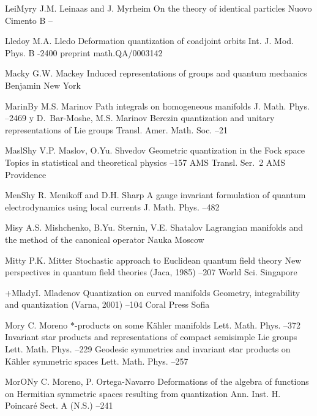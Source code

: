 \documentclass[11pt]{amsart}
\numberwithin{equation}{section}
\theoremstyle{remark}
\newcommand{\by}{\mathbf y}
\begin{document}
\begin{thebibliography}{199}
 LeiMyr\by{ J.M. Leinaas and J. Myrheim \paper On the theory of identical particles
\jour Nuovo Cimento B   --}

 Lledo\by{ M.A. Lledo \paper Deformation quantization of coadjoint orbits
\jour Int. J. Mod. Phys. B    -2400 \paperinfo preprint
math.QA/0003142}

 Mack\by{ G.W. Mackey \book Induced representations of groups and quantum
mechanics \publ Benjamin \publaddr New York }

 MarinB\by{ M.S. Marinov \paper Path integrals on homogeneous manifolds
\jour J. Math. Phys.   --2469 \moreref \by
D.~Bar-Moshe, M.S. Marinov \paper Berezin quantization and unitary
representations of Lie groups \jour Transl. Amer. Math. Soc. 
 --21}

 MaslSh\by{ V.P. Maslov, O.Yu. Shvedov \paper Geometric quantization in
the Fock space \inbook Topics in statistical and theoretical physics --157 \bookinfo AMS Transl. Ser.~2  \publ AMS \publaddr Providence
}

 MenSh\by{ R. Menikoff and D.H. Sharp \paper A gauge invariant formulation
of quantum electrodynamics using local currents
\jour J. Math. Phys.   --482}

 Mis\by{ A.S. Mishchenko, B.Yu. Sternin, V.E. Shatalov \book Lagrangian
manifolds and the method of the canonical operator \publ Nauka \publaddr Moscow
}

 Mitt\by{ P.K. Mitter \paper Stochastic approach to Euclidean quantum
field theory \inbook New perspectives in quantum field theories (Jaca, 1985)
--207 \publ World Sci. \publaddr Singapore }

 +Mlad\by{I. Mladenov \paper Quantization on curved manifolds \inbook
Geometry, integrability and quantization (Varna, 2001) --104 \publ
Coral Press \publaddr Sofia }

 Mor\by{ C. Moreno \paper $*$-products on some K\"ahler manifolds \jour
Lett. Math. Phys.   --372 \moreref \paper Invariant
star products and representations of compact semisimple Lie groups \jour Lett.
Math. Phys.   --229 \moreref \paper Geodesic
symmetries and invariant star products on K\"ahler symmetric spaces \jour Lett.
Math. Phys.   --257}

 MorON\by{ C. Moreno, P. Ortega-Navarro \paper Deformations of the algebra
of functions on Hermitian symmetric spaces resulting from quantization \jour
Ann. Inst. H. Poincar\'e Sect. A (N.S.)   --241}


\end{thebibliography}
\end{document}
